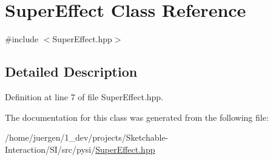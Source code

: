 \hypertarget{class_super_effect}{}\section{Super\+Effect Class Reference}
\label{class_super_effect}


{\ttfamily \#include $<$Super\+Effect.\+hpp$>$}



\subsection{Detailed Description}


Definition at line 7 of file Super\+Effect.\+hpp.



The documentation for this class was generated from the following file\+:\begin{DoxyCompactItemize}
\item 
/home/juergen/1\+\_\+dev/projects/\+Sketchable-\/\+Interaction/\+S\+I/src/pysi/\mbox{\hyperlink{_super_effect_8hpp}{Super\+Effect.\+hpp}}\end{DoxyCompactItemize}
